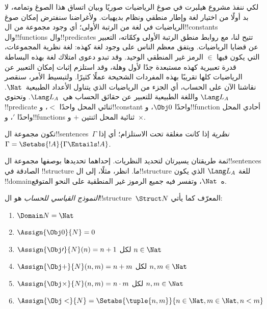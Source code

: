 \documentclass[../../../include/open-logic-section]{subfiles}
\begin{document}


لكي ننفذ مشروع هيلبرت في صوغ الرياضيات صوريًا وبيان اتساق هذا الصوغ
وتمامه، لا بد أولًا من اختيار لغة وإطار منطقي ونظام بديهيات. ولأغراضنا
سنفترض إمكان صوغ الرياضيات في لغة من الرتبة الأولى؛ أي وجود مجموعة من
ال!!{constant}s وال!!{function}s وال!!{predicate}s تتيح لنا، مع روابط
منطق الرتبة الأولى وكمّاته، التعبير عن قضايا الرياضيات. ويتفق معظم
الناس على وجود لغة كهذه: لغة نظرية المجموعات، التي يكون فيها $\in$
الرمز غير المنطقي الوحيد. وقد تبدو دعوى امتلاك لغة بهذه البساطة قدرة
تعبيرية كهذه مستبعدة جدًا لأول وهلة، وقد استلزم إثبات إمكان التعبير
عن الرياضيات كلها تقريبًا بهذه المفردات الشحيحة عملًا كثيرًا. ولتبسيط
الأمر، سنقصر نقاشنا الآن على الحساب، أي الجزء من الرياضيات الذي يتناول
الأعداد الطبيعية~$\Nat$. واللغة الطبيعية للتعبير عن حقائق الحساب
هي~$\Lang L_A$. وتحتوي $\Lang L_A$ !!{predicate} ثنائي المحل واحدًا
$<$، و!!{constant} واحدًا $\Obj 0$، و!!{function} أحادي المحل واحدًا
$\prime$، و!!{function}s ثنائية المحل اثنتين $+$ و~$\times$.

\begin{defn}
تكون مجموعة ال!!{sentence}s~$\Gamma$ \emph{نظرية} إذا كانت مغلقة
تحت الاستلزام؛ أي إذا
$\Gamma = \Setabs{!A}{\Gamma \Entails !A}$.
\end{defn}

ثمة طريقتان يسيرتان لتحديد النظريات. إحداهما تحديدها بوصفها مجموعة
ال!!{sentence}s الصادقة في !!{structure} ما. انظر، مثلًا، إلى
ال!!{structure} للغة $\Lang L_A$ الذي يكون !!{domain}ه~$\Nat$، وتفسر
فيه جميع الرموز غير المنطقية على النحو المتوقع.

\begin{defn}
\emph{النموذج القياسي للحساب} هو ال!!{structure}~$\Struct N$ المعرّف
كما يأتي:
\begin{enumerate}
\item $\Domain N = \Nat$
\item $\Assign{\Obj 0}{N} = 0$
\item $\Assign{\Obj \prime}{N}(n) = n + 1$ لكل $n \in \Nat$
\item $\Assign{\Obj +}{N}(n, m) = n + m$ لكل $n, m \in \Nat$
\item $\Assign{\Obj \times}{N}(n, m) = n\cdot m$ لكل $n, m \in \Nat$
\item $\Assign{\Obj <}{N} = \Setabs{\tuple{n, m}}{n \in \Nat, m \in
  \Nat, n < m}$
\end{enumerate}
\end{defn}
\end{document}
